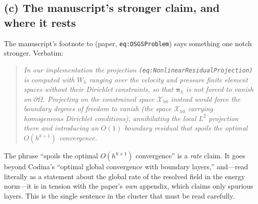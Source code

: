 \documentclass[11pt]{article}
\theoremstyle{plain}
\theoremstyle{definition}
\theoremstyle{remark}
\begin{document}
\subsection{(c) The manuscript's stronger claim, and where it rests}

The manuscript's footnote to (paper, \texttt{eq:OSGSProblem}) says
something one notch stronger. Verbatim:

\begin{quote}\itshape
In our implementation the projection \texttt{(eq:NonlinearResidualProjection)}
is computed with $W_h$ ranging over the velocity and pressure finite
element spaces \emph{without} their Dirichlet constraints, so that
$\bm\pi_h$ is not forced to vanish on $\partial\Omega$. Projecting on the
constrained space $\mathcal X_{h0}$ instead would force the boundary
degrees of freedom to vanish (the space $\mathcal X_{h0}$ carrying
homogeneous Dirichlet conditions), annihilating the local $L^2$
projection there and introducing an $O(1)$ boundary residual that spoils
the optimal $O(h^{k+1})$ convergence.
\end{quote}

The phrase ``spoils the optimal $O(h^{k+1})$ convergence'' is a
\emph{rate} claim. It goes beyond Codina's ``optimal global convergence
with boundary layers,'' and---read literally as a statement about the
global rate of the resolved field in the energy norm---it is in tension
with the paper's \emph{own} appendix, which claims only spurious layers.
This is the single sentence in the cluster that must be read carefully.
\end{document}
